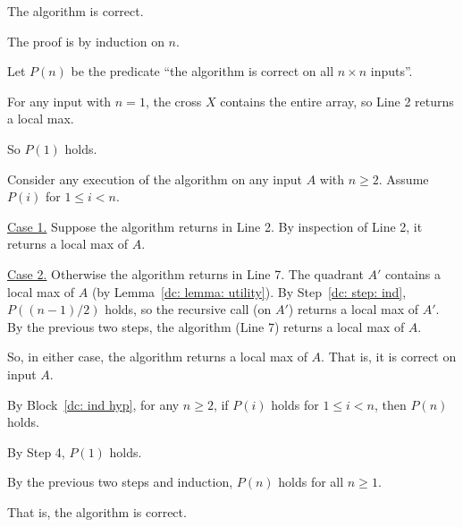 \begin{lemma}[Wrong!]\label{dc: lemma: local max}
  The algorithm is correct.
\end{lemma}
\begin{longFormProof}
  \step The proof is by induction on $n$.

  \step Let $P(n)$ be the predicate ``the algorithm is correct on all $n\times n$ inputs''.

  \step For any input with $n=1$, the cross $X$ contains the entire array, so Line 2 returns a local max.

  \step So $P(1)$ holds.

  \begin{block}
    \step\label{dc: step: ind} Consider any execution of the algorithm on any input $A$ with $n\ge 2$.
    Assume $P(i)$ for $1\le i < n$.

    \begin{block}
      \step \underline{Case 1.} Suppose the algorithm returns in Line 2.
      \step By inspection of Line 2, it returns a local max of $A$.
    \end{block}
    \begin{block}
      \step \underline{Case 2.} Otherwise the algorithm returns in Line 7.
      \step The quadrant $A'$ contains a local max of $A$ (by Lemma~\ref{dc: lemma: utility}).
      \step By Step~\ref{dc: step: ind}, $P((n-1)/2)$ holds, so the recursive call (on $A'$) returns a local max of $A'$.
      \step By the previous two steps, the algorithm (Line 7) returns a local max of $A$.
    \end{block}
    \step So, in either case, the algorithm returns a local max of $A$.  That is, it is correct on input $A$.
  \end{block}

  \step By Block~\ref{dc: ind hyp}, for any $n\ge 2$, if $P(i)$ holds for $1\le i < n$,
  then $P(n)$ holds.
  
  \step By Step 4, $P(1)$ holds.

  \step By the previous two steps and induction, $P(n)$ holds for all $n\ge 1$.

  \step That is, the algorithm is correct.
\end{longFormProof}

